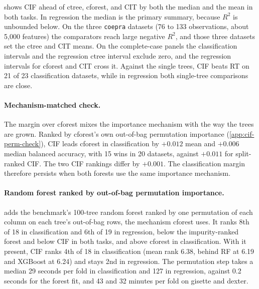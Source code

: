  shows CIF ahead of ctree,
cforest, and CIT by both the median and the mean in both tasks. In regression
the median is the primary summary, because $R^2$ is unbounded below. On the
three \nolinkurl{coepra} datasets (76 to 133 observations, about 5,000
features) the comparators reach large negative $R^2$, and those three datasets
set the ctree and CIT means. On the complete-case panels the classification
intervals and the regression ctree interval exclude zero, and the regression
intervals for cforest and CIT cross it. Against the single trees, CIF beats RT
on 21 of 23 classification datasets, while in regression both single-tree
comparisons are close.

\paragraph{Mechanism-matched check.}
The margin over cforest mixes the importance mechanism with the way the trees
are grown. Ranked by cforest's own out-of-bag permutation importance
(\cref{app:cif-perm-check}), CIF leads cforest in classification by $+0.012$
mean and $+0.006$ median balanced accuracy, with 15 wins in 20 datasets,
against $+0.011$ for split-ranked CIF. The two CIF rankings differ by $+0.001$.
The classification margin therefore persists when both forests use the same
importance mechanism.

\paragraph{Random forest ranked by out-of-bag permutation importance.}
 adds the benchmark's 100-tree random forest
ranked by one permutation of each column on each tree's out-of-bag rows, the
mechanism cforest uses. It ranks 8th of 18 in classification and 6th of 19 in
regression, below the impurity-ranked forest and below CIF in both tasks, and
above cforest in classification. With it present, CIF ranks 4th of 18 in
classification (mean rank 6.38, behind RF at 6.19 and XGBoost at 6.24) and
stays 2nd in regression. The permutation step takes a median 29 seconds per
fold in classification and 127 in regression, against 0.2 seconds for the
forest fit, and 43 and 32 minutes per fold on gisette and dexter.

